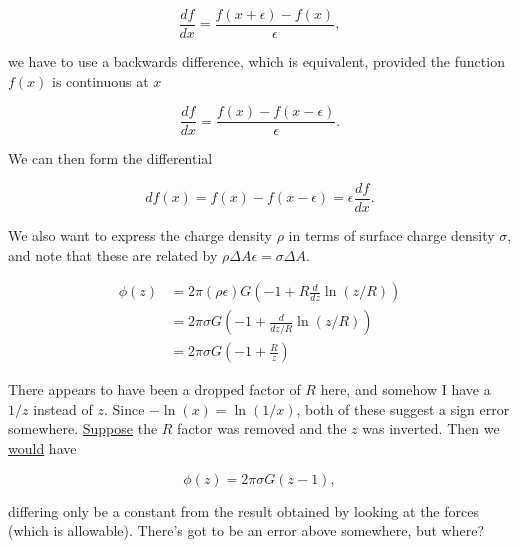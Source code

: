 \begin{equation}\label{eqn:classicalMechanicsPs2:310}
\frac{df}{dx} = \frac{f(x + \epsilon) - f(x)}{\epsilon},
\end{equation}

we have to use a backwards difference, which is equivalent, provided the function $f(x)$ is continuous at $x$

\begin{equation}\label{eqn:classicalMechanicsPs2:310b}
\frac{df}{dx} = \frac{f(x) - f(x -\epsilon)}{\epsilon}.
\end{equation}

We can then form the differential

\begin{equation}\label{eqn:qmTwoExamReflection:310c}
df(x) = f(x) - f(x -\epsilon) = \epsilon \frac{df}{dx}.
\end{equation}

We also want to express the charge density $\rho$ in terms of surface charge density $\sigma$, and note that these are related by $\rho \Delta A \epsilon = \sigma \Delta A$.

\begin{align*}
\phi(z) 
&=
2 \pi (\rho \epsilon) G 
\left( -1 + R \frac{d}{dz} \ln(z/R) \right) \\
&=
2 \pi \sigma G 
\left( -1 + \frac{d}{dz/R} \ln(z/R) \right) \\
&=
2 \pi \sigma G 
\left( -1 + \frac{R}{z} \right)
\end{align*}

There appears to have been a dropped factor of $R$ here, and somehow I have a $1/z$ instead of $z$.  Since $-\ln(x) = \ln(1/x)$, both of these suggest a sign error somewhere.  \underline{Suppose} the $R$ factor was removed and the $z$ was inverted.  Then we \underline{would} have 

\begin{equation}\label{eqn:classicalMechanicsPs2:330}
\phi(z) =
2 \pi \sigma G (z - 1),
\end{equation}

differing only be a constant from the result obtained by looking at the forces (which is allowable).  There's got to be an error above somewhere, but where?

\EndNoBibArticle
